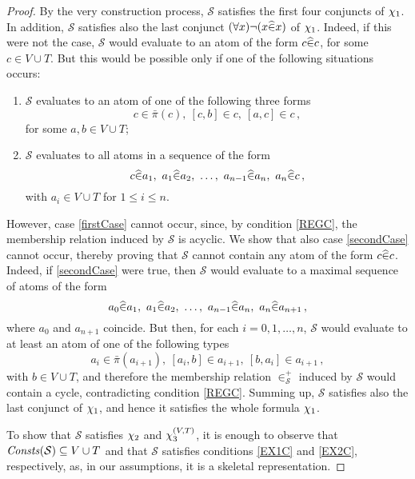 \documentclass[a4paper]{llncs}
\newcommand{\memclosure}[1]{\in_{#1}^{+}}
\newcommand{\pairin}[3]{\left[#1,#2\right] \in #3}
\newcommand{\nonpairin}[2]{#1 \in \bar{\pi}(#2)}
\newcommand{\atset}{\mathcal{S}}
\newcommand{\consta}{a}
\newcommand{\constb}{b}
\newcommand{\constc}{c}
\begin{document}
\begin{proof}
By the very construction process, $\atset$ satisfies the first four
conjuncts of $\chi_1$.  In addition, $\atset$ satisfies also the last
conjunct $(\forall x)\neg(x \widehat{\in} x)$ of $\chi_1$.  Indeed, if this
were not the case, $\atset$ would evaluate to \true an atom of the form
$\memhat{\constc}{\constc}$, for some $\constc \in V \cup T$.  But 
this would be
possible only if one of the following situations occurs:
\begin{enumerate}[label={(\alph*)}]
\item\label{firstCase} $\atset$ evaluates to \true an atom of one of the
following three forms
\[
\nonpairin{\constc}{\constc},~ \pairin{\constc}{\constb}{\constc},~
\pairin{\consta}{\constc}{\constc}\,,
\]
for some $\consta,\constb \in V \cup T$;

\item\label{secondCase} $\atset$ evaluates to \true all atoms in a 
sequence of the form
\[
\memhat{\constc}{\consta_{1}},~\memhat{\consta_{1}}{\consta_{2}},~ \ldots,~
\memhat{\consta_{n-1}}{\consta_{n}},~\memhat{\consta_{n}}{\constc}\,,
\]
with $\consta_{i} \in V \cup T$ for $1 \leq i \leq n$.
\end{enumerate}
However, case \ref{firstCase} cannot occur, since, by condition
\ref{REGC}, the membership relation induced by $\atset$ is acyclic.
We show that also case \ref{secondCase} cannot occur, thereby proving
that $\atset$ cannot contain any atom of the form $\memhat{\constc}{\constc}$.
Indeed, if \ref{secondCase} were true, then $\atset$ would evaluate to \true a
maximal sequence of atoms of the form
\[
\memhat{\consta_{0}}{\consta_{1}},~\memhat{\consta_{1}}{\consta_{2}},~ \ldots,~
\memhat{\consta_{n-1}}{\consta_{n}},~\memhat{\consta_{n}}{\consta_{n+1}}\,,
\]
where $\consta_{0}$ and $\consta_{n+1}$ coincide. But then, for each
$i=0,1,\ldots,n$, $\atset$ would evaluate to \true at least an atom of one of
the following types
\[
\nonpairin{\consta_i}{\consta_{i+1}},~ 
\pairin{\consta_{i}}{\constb}{\consta_{i+1}},~
\pairin{\constb}{\consta_{i}}{\consta_{i+1}}\,,
\]
with $\constb \in V \cup T$, and therefore the membership relation
$\memclosure{\atset}$ induced by $\atset$ would contain a cycle,
contradicting condition \ref{REGC}.
%
Summing up, $\atset$ satisfies also the last conjunct of $\chi_1$,
and hence it satisfies the whole formula $\chi_1$.

To show that $\atset$ satisfies $\chi_2$ and $\chi_3^{(V,T)}$, it is enough
to observe that $\Consts(\atset)\subseteq V \cup T$ and that $\atset$ satisfies
conditions \ref{EX1C} and \ref{EX2C}, respectively, as, in our assumptions,
it is a skeletal representation.


\end{proof}
\end{document}
